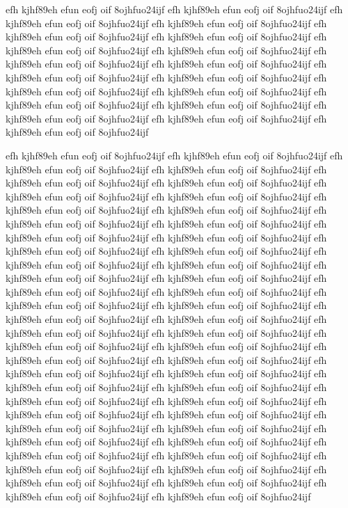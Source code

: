 \documentclass[a4paper,12pt]{book} %
\begin{document}
efh kjhf89eh efun eofj oif 8ojhfuo24ijf
efh kjhf89eh efun eofj oif 8ojhfuo24ijf
efh kjhf89eh efun eofj oif 8ojhfuo24ijf
efh kjhf89eh efun eofj oif 8ojhfuo24ijf
efh kjhf89eh efun eofj oif 8ojhfuo24ijf
efh kjhf89eh efun eofj oif 8ojhfuo24ijf
efh kjhf89eh efun eofj oif 8ojhfuo24ijf
efh kjhf89eh efun eofj oif 8ojhfuo24ijf
efh kjhf89eh efun eofj oif 8ojhfuo24ijf
efh kjhf89eh efun eofj oif 8ojhfuo24ijf
efh kjhf89eh efun eofj oif 8ojhfuo24ijf
efh kjhf89eh efun eofj oif 8ojhfuo24ijf
efh kjhf89eh efun eofj oif 8ojhfuo24ijf
efh kjhf89eh efun eofj oif 8ojhfuo24ijf
efh kjhf89eh efun eofj oif 8ojhfuo24ijf
efh kjhf89eh efun eofj oif 8ojhfuo24ijf
efh kjhf89eh efun eofj oif 8ojhfuo24ijf
efh kjhf89eh efun eofj oif 8ojhfuo24ijf
efh kjhf89eh efun eofj oif 8ojhfuo24ijf

efh kjhf89eh efun eofj oif 8ojhfuo24ijf
efh kjhf89eh efun eofj oif 8ojhfuo24ijf
efh kjhf89eh efun eofj oif 8ojhfuo24ijf
efh kjhf89eh efun eofj oif 8ojhfuo24ijf
efh kjhf89eh efun eofj oif 8ojhfuo24ijf
efh kjhf89eh efun eofj oif 8ojhfuo24ijf
efh kjhf89eh efun eofj oif 8ojhfuo24ijf
efh kjhf89eh efun eofj oif 8ojhfuo24ijf
efh kjhf89eh efun eofj oif 8ojhfuo24ijf
efh kjhf89eh efun eofj oif 8ojhfuo24ijf
efh kjhf89eh efun eofj oif 8ojhfuo24ijf
efh kjhf89eh efun eofj oif 8ojhfuo24ijf
efh kjhf89eh efun eofj oif 8ojhfuo24ijf
efh kjhf89eh efun eofj oif 8ojhfuo24ijf
efh kjhf89eh efun eofj oif 8ojhfuo24ijf
efh kjhf89eh efun eofj oif 8ojhfuo24ijf
efh kjhf89eh efun eofj oif 8ojhfuo24ijf
efh kjhf89eh efun eofj oif 8ojhfuo24ijf
efh kjhf89eh efun eofj oif 8ojhfuo24ijf
efh kjhf89eh efun eofj oif 8ojhfuo24ijf
efh kjhf89eh efun eofj oif 8ojhfuo24ijf
efh kjhf89eh efun eofj oif 8ojhfuo24ijf
efh kjhf89eh efun eofj oif 8ojhfuo24ijf
efh kjhf89eh efun eofj oif 8ojhfuo24ijf
efh kjhf89eh efun eofj oif 8ojhfuo24ijf
efh kjhf89eh efun eofj oif 8ojhfuo24ijf
efh kjhf89eh efun eofj oif 8ojhfuo24ijf
efh kjhf89eh efun eofj oif 8ojhfuo24ijf
efh kjhf89eh efun eofj oif 8ojhfuo24ijf
efh kjhf89eh efun eofj oif 8ojhfuo24ijf
efh kjhf89eh efun eofj oif 8ojhfuo24ijf
efh kjhf89eh efun eofj oif 8ojhfuo24ijf
efh kjhf89eh efun eofj oif 8ojhfuo24ijf
efh kjhf89eh efun eofj oif 8ojhfuo24ijf
efh kjhf89eh efun eofj oif 8ojhfuo24ijf
efh kjhf89eh efun eofj oif 8ojhfuo24ijf
efh kjhf89eh efun eofj oif 8ojhfuo24ijf
efh kjhf89eh efun eofj oif 8ojhfuo24ijf
efh kjhf89eh efun eofj oif 8ojhfuo24ijf
efh kjhf89eh efun eofj oif 8ojhfuo24ijf
efh kjhf89eh efun eofj oif 8ojhfuo24ijf
efh kjhf89eh efun eofj oif 8ojhfuo24ijf
efh kjhf89eh efun eofj oif 8ojhfuo24ijf
efh kjhf89eh efun eofj oif 8ojhfuo24ijf
efh kjhf89eh efun eofj oif 8ojhfuo24ijf
efh kjhf89eh efun eofj oif 8ojhfuo24ijf
efh kjhf89eh efun eofj oif 8ojhfuo24ijf
efh kjhf89eh efun eofj oif 8ojhfuo24ijf
efh kjhf89eh efun eofj oif 8ojhfuo24ijf
efh kjhf89eh efun eofj oif 8ojhfuo24ijf
efh kjhf89eh efun eofj oif 8ojhfuo24ijf
efh kjhf89eh efun eofj oif 8ojhfuo24ijf
\end{document}
